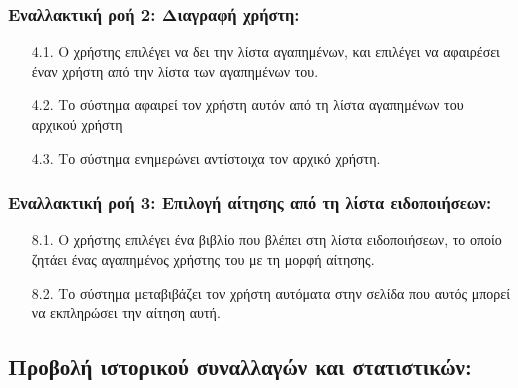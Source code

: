 \documentclass[12pt,a4paper]{article}
\begin{document}
\subsubsection*{Εναλλακτική ροή 2: Διαγραφή χρήστη:}
\begin{enumerate}
    \item [4.1.] Ο χρήστης επιλέγει να δει την λίστα αγαπημένων, και επιλέγει να αφαιρέσει έναν χρήστη από την λίστα των αγαπημένων του.
    \item [4.2.] Το σύστημα αφαιρεί τον χρήστη αυτόν από τη λίστα αγαπημένων του αρχικού χρήστη
    \item [4.3.] Το σύστημα ενημερώνει αντίστοιχα τον αρχικό χρήστη.
\end{enumerate}

\subsubsection*{Εναλλακτική ροή 3: Επιλογή αίτησης από τη λίστα ειδοποιήσεων:}
\begin{enumerate}
    \item [8.1.] Ο χρήστης επιλέγει ένα βιβλίο που βλέπει στη λίστα ειδοποιήσεων, το οποίο ζητάει ένας αγαπημένος χρήστης του με τη μορφή αίτησης.
    \item [8.2.] Το σύστημα μεταβιβάζει τον χρήστη αυτόματα στην σελίδα που αυτός μπορεί να εκπληρώσει την αίτηση αυτή.
\end{enumerate}

\subsection{Προβολή ιστορικού συναλλαγών και στατιστικών:}
\end{document}

